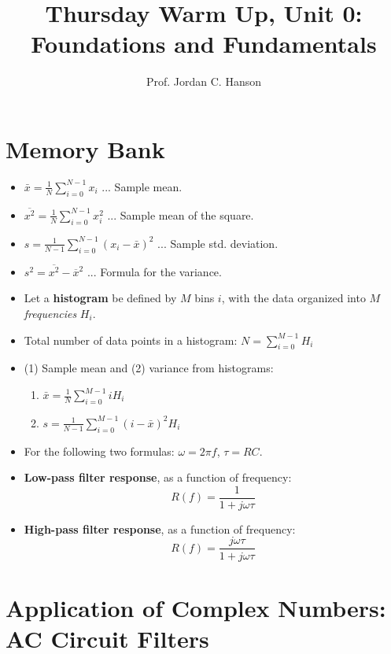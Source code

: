 \documentclass{article}
\begin{document}
\twocolumn

\title{Thursday Warm Up, Unit 0: Foundations and Fundamentals}
\author{Prof. Jordan C. Hanson}
\maketitle

\section{Memory Bank}
\small
\begin{itemize}
\item $\bar{x} = \frac{1}{N}\sum_{i=0}^{N-1} x_i$ ... Sample mean.
\item $\overline{x^2} = \frac{1}{N}\sum_{i=0}^{N-1} x_i^2$ ... Sample mean of the square.
\item $s = \frac{1}{N-1}\sum_{i=0}^{N-1} (x_i - \bar{x})^2$ ... Sample std. deviation.
\item $s^2 = \overline{x^2} - \overline{x}^2$ ... Formula for the variance.
\item Let a \textbf{histogram} be defined by $M$ bins $i$, with the data organized into $M$ \textit{frequencies} $H_i$.
\item Total number of data points in a histogram: $N = \sum_{i=0}^{M-1} H_i$
\item (1) Sample mean and (2) variance from histograms: 
\begin{enumerate}
\item $\bar{x} = \frac{1}{N}\sum_{i=0}^{M-1} i H_i$
\item $s = \frac{1}{N-1}\sum_{i=0}^{M-1} (i-\bar{x})^2 H_i$
\end{enumerate}
\item For the following two formulas: $\omega = 2\pi f$, $\tau = RC$.
\item \textbf{Low-pass filter response}, as a function of frequency:
\begin{equation}
R(f) = \frac{1}{1+j\omega \tau}
\end{equation}
\item \textbf{High-pass filter response}, as a function of frequency:
\begin{equation}
R(f) = \frac{j\omega\tau}{1+j\omega \tau}
\end{equation}
\end{itemize}
\normalsize

\section{Application of Complex Numbers: AC Circuit Filters}
\end{document}
